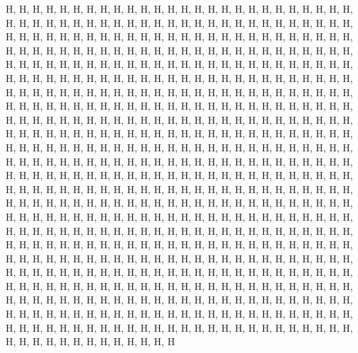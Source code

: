 H, H, H, H, H, H, H, H, H, H, H, H, H, H, H, H, H, H, H, H, H, H, H, H, H, H, H, H, H, H, H, H, H, H, H, H, H, H, H, H, H, H, H, H, H, H, H, H, H, H, H, H, H, H, H, H, H, H, H, H, H, H, H, H, H, H, H, H, H, H, H, H, H, H, H, H, H, H, H, H, H, H, H, H, H, H, H, H, H, H, H, H, H, H, H, H, H, H, H, H, H, H, H, H, H, H, H, H, H, H, H, H, H, H, H, H, H, H, H, H, H, H, H, H, H, H, H, H, H, H, H, H, H, H, H, H, H, H, H, H, H, H, H, H, H, H, H, H, H, H, H, H, H, H, H, H, H, H, H, H, H, H, H, H, H, H, H, H, H, H, H, H, H, H, H, H, H, H, H, H, H, H, H, H, H, H, H, H, H, H, H, H, H, H, H, H, H, H, H, H, H, H, H, H, H, H, H, H, H, H, H, H, H, H, H, H, H, H, H, H, H, H, H, H, H, H, H, H, H, H, H, H, H, H, H, H, H, H, H, H, H, H, H, H, H, H, H, H, H, H, H, H, H, H, H, H, H, H, H, H, H, H, H, H, H, H, H, H, H, H, H, H, H, H, H, H, H, H, H, H, H, H, H, H, H, H, H, H, H, H, H, H, H, H, H, H, H, H, H, H, H, H, H, H, H, H, H, H, H, H, H, H, H, H, H, H, H, H, H, H, H, H, H, H, H, H, H, H, H, H, H, H, H, H, H, H, H, H, H, H, H, H, H, H, H, H, H, H, H, H, H, H, H, H, H, H, H, H, H, H, H, H, H, H, H, H, H, H, H, H, H, H, H, H, H, H, H, H, H, H, H, H, H, H, H, H, H, H, H, H, H, H, H, H, H, H, H, H, H, H, H, H, H, H, H, H, H, H, H, H, H, H, H, H, H, H, H, H, H, H, H, H, H, H, H, H, H, H, H, H, H, H, H, H, H, H, H, H, H, H, H, H, H, H, H, H, H, H, H, H, H, H, H, H, H, H, H, H, H, H, H, H, H, H, H, H, H, H, H, H, H, H, H, H, H, H, H, H, H, H, H, H, H, H, H, H, H, H, H, H, H, H, H, H, H, H, H, H, H, H, H, H, H, H, H, H, H, H, H, H, H, H, H, H, H, H, H, H, H, H, H, H, H, H, H, H, H, H, H, H, H, H, H, H, H, H, H, H, H, H, H, H, H, H, H, H, H, H, H, H, H, H, H, H, H, H, H, H, H, H, H, H, H, H, H, H, H, H, H, H, H, H, H, H, H, H, H, H, H, H, H, H, H, H, H, H, H, H, H, H, H, H, H, H, H, H, H, H, H, H, H, H, H, H, H, H, H, H, H, H, H, H, H, H, H, H, H, H, H, H, H, H, H, H, H, H, H, H, H, H, H, H, H, H, H, H, H